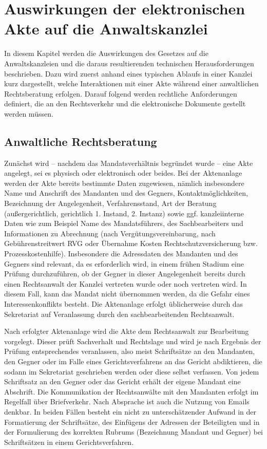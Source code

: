
\section{Auswirkungen der elektronischen Akte auf die Anwaltskanzlei}
In diesem Kapitel werden die Auswirkungen des Gesetzes auf die Anwaltskanzleien und die daraus resultierenden technischen Herausforderungen beschrieben. Dazu wird zuerst anhand eines typischen Ablaufs in einer Kanzlei kurz dargestellt, welche Interaktionen mit einer Akte während einer anwaltlichen Rechtsberatung erfolgen. Darauf folgend werden rechtliche Anforderungen definiert, die an den Rechtsverkehr und die elektronische Dokumente gestellt werden müssen.
\subsection{Anwaltliche Rechtsberatung}
Zunächst wird – nachdem das Mandatsverhältnis begründet wurde – eine Akte angelegt, sei es physisch oder elektronisch oder beides. Bei der Aktenanlage werden der Akte bereits bestimmte Daten zugewiesen, nämlich insbesondere Name und Anschrift des Mandanten und des Gegners, Kontaktmöglichkeiten, Bezeichnung der Angelegenheit, Verfahrensstand, Art der Beratung (außergerichtlich, gerichtlich 1. Instand, 2. Instanz) sowie ggf. kanzleiinterne Daten wie zum Beispiel Name des Mandatsführers, des Sachbearbeiters und Informationen zu Abrechnung (nach Vergütungsvereinbarung, nach Gebührenstreitwert RVG oder Übernahme Kosten Rechtschutzversicherung bzw. Prozesskostenhilfe). Insbesondere die Adressdaten des Mandanten und des Gegners sind relevant, da es erforderlich wird, in einem frühen Stadium eine Prüfung durchzuführen, ob der Gegner in dieser Angelegenheit bereits durch einen Rechtsanwalt der Kanzlei vertreten wurde oder noch vertreten wird. In diesem Fall, kann das Mandat nicht übernommen werden, da die Gefahr eines Interessenkonflikts besteht. Die Aktenanlage erfolgt üblicherweise durch das Sekretariat auf Veranlassung durch den sachbearbeitenden Rechtsanwalt.
 
Nach erfolgter Aktenanlage wird die Akte dem Rechtsanwalt zur Bearbeitung vorgelegt. Dieser prüft Sachverhalt und Rechtslage und wird je nach Ergebnis der Prüfung entsprechendes veranlassen, also meist Schriftsätze an den Mandanten, den Gegner oder im Falle eines Gerichtsverfahrens an das Gericht abdiktieren, die sodann im Sekretariat geschrieben werden oder diese selbst verfassen. Von jedem Schriftsatz an den Gegner oder das Gericht erhält der eigene Mandant eine Abschrift. Die Kommunikation der Rechtsanwälte mit den Mandanten erfolgt im Regelfall über Briefverkehr. Nach Absprache ist auch die Nutzung von Emails denkbar. In beiden Fällen besteht ein nicht zu unterschätzender Aufwand in der Formatierung der Schriftsätze, des Einfügens der Adressen der Beteiligten und in der Formulierung des korrekten Rubrums (Bezeichnung Mandant und Gegner) bei Schriftsätzen in einem Gerichtsverfahren.
 
